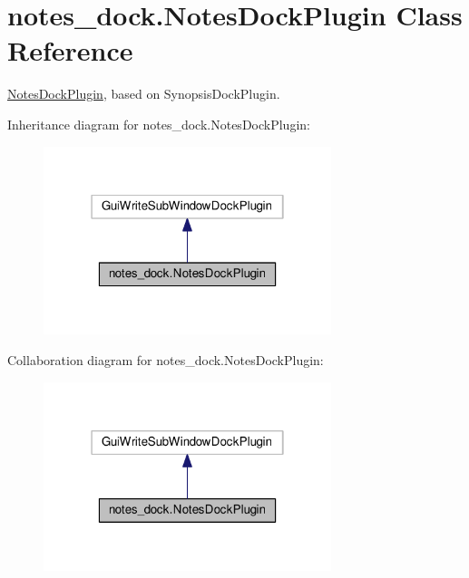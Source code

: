 \hypertarget{classnotes__dock_1_1_notes_dock_plugin}{}\section{notes\+\_\+dock.\+Notes\+Dock\+Plugin Class Reference}
\label{classnotes__dock_1_1_notes_dock_plugin}


\hyperlink{classnotes__dock_1_1_notes_dock_plugin}{Notes\+Dock\+Plugin}, based on Synopsis\+Dock\+Plugin.  




Inheritance diagram for notes\+\_\+dock.\+Notes\+Dock\+Plugin\+:\nopagebreak
\begin{figure}[H]
\begin{center}
\leavevmode
\includegraphics[width=238pt]{classnotes__dock_1_1_notes_dock_plugin__inherit__graph}
\end{center}
\end{figure}


Collaboration diagram for notes\+\_\+dock.\+Notes\+Dock\+Plugin\+:\nopagebreak
\begin{figure}[H]
\begin{center}
\leavevmode
\includegraphics[width=238pt]{classnotes__dock_1_1_notes_dock_plugin__coll__graph}
\end{center}
\end{figure}
